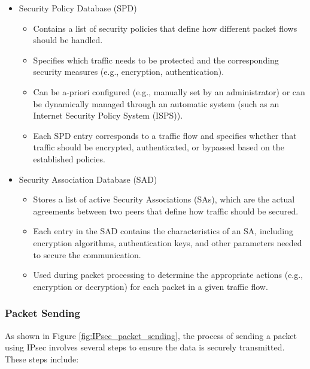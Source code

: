 \begin{itemize}
    \item Security Policy Database (SPD)
    \begin{itemize}
        \item Contains a list of security policies that define how different packet flows should be handled.
        \item Specifies which traffic needs to be protected and the corresponding security measures (e.g., encryption, authentication).
        \item Can be a-priori configured (e.g., manually set by an administrator) or can be dynamically managed through an automatic system (such as an Internet Security Policy System (ISPS)).
        \item Each SPD entry corresponds to a traffic flow and specifies whether that traffic should be encrypted, authenticated, or bypassed based on the established policies.
    \end{itemize}
    \item Security Association Database (SAD)
    \begin{itemize}
        \item Stores a list of active Security Associations (SAs), which are the actual agreements between two peers that define how traffic should be secured.
        \item Each entry in the SAD contains the characteristics of an SA, including encryption algorithms, authentication keys, and other parameters needed to secure the communication.
        \item Used during packet processing to determine the appropriate actions (e.g., encryption or decryption) for each packet in a given traffic flow.
    \end{itemize}
\end{itemize}

\subsubsection{Packet Sending}

As shown in Figure \ref{fig:IPsec_packet_sending}, the process of sending a packet using IPsec involves several steps to ensure the data is securely transmitted. These steps include:

